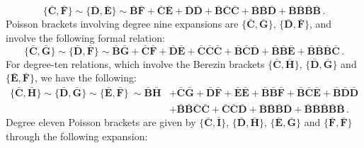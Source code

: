 \documentclass[10pt]{amsart}
\theoremstyle{definition}
\theoremstyle{corollary}
\theoremstyle{remark}
\theoremstyle{conclusion}
\begin{document}
\begin{equation}
	\{\bar{\mathbf{C}}, \bar{\mathbf{F}}\} \sim \{\bar{\mathbf{D}}, \bar{\mathbf{E}}\}\sim  \bar{\mathbf{B}}\bar{\mathbf{F}}+\bar{\mathbf{C}}\bar{\mathbf{E}}+\bar{\mathbf{D}}\bar{\mathbf{D}}+\bar{\mathbf{B}}\bar{\mathbf{C}}\bar{\mathbf{C}}+\bar{\mathbf{B}}\bar{\mathbf{B}}\bar{\mathbf{D}}+\bar{\mathbf{B}}\bar{\mathbf{B}}\bar{\mathbf{B}}\bar{\mathbf{B}} \,  .
	\label{deg8b}
\end{equation}
Poisson brackets involving degree nine expansions are $\{\bar{\mathbf{C}},\bar{\mathbf{G}}\}$,  $\{\bar{\mathbf{D}},\bar{\mathbf{F}} \}$, and involve the following formal relation:
\begin{equation}
	\{\bar{\mathbf{C}}, \bar{\mathbf{G}}\} \sim \{\bar{\mathbf{D}}, \bar{\mathbf{F}}\}\sim  \bar{\mathbf{B}} \bar{\mathbf{G}}+ \bar{\mathbf{C}} \bar{\mathbf{F}}+ \bar{\mathbf{D}} \bar{\mathbf{E}}+ \bar{\mathbf{C}} \bar{\mathbf{C}} \bar{\mathbf{C}}+ \bar{\mathbf{B}} \bar{\mathbf{C}} \bar{\mathbf{D}}+\bar{\mathbf{B}} \bar{\mathbf{B}} \bar{\mathbf{E}}+ \bar{\mathbf{B}} \bar{\mathbf{B}} \bar{\mathbf{B}} \bar{\mathbf{C}}\,  .
	\label{deg9b}
\end{equation}
For degree-ten relations, which involve the Berezin brackets $\{\bar{\mathbf{C}},\bar{\mathbf{H}} \}$,  $\{\bar{\mathbf{D}},\bar{\mathbf{G}} \}$ and $\{\bar{\mathbf{E}},\bar{\mathbf{F}} \}$, we have the following:
\begin{align}
	\{\bar{\mathbf{C}}, \bar{\mathbf{H}}\} \sim \{\bar{\mathbf{D}}, \bar{\mathbf{G}}\}\sim \{\bar{\mathbf{E}},\bar{ \mathbf{F}}\}\  \sim  \bar{\mathbf{B}}\bar{\mathbf{H}}&+\bar{\mathbf{C}}\bar{\mathbf{G}}+\bar{\mathbf{D}}\bar{\mathbf{F}}+\bar{\mathbf{E}}\bar{\mathbf{E}}+\bar{\mathbf{B}}\bar{\mathbf{B}}\bar{\mathbf{F}}+\bar{\mathbf{B}}\bar{\mathbf{C}}\bar{\mathbf{E}}+\bar{\mathbf{B}}\bar{\mathbf{D}}\bar{\mathbf{D}}\nonumber \\
&+\bar{\mathbf{B}}\bar{\mathbf{B}}\bar{\mathbf{C}}\bar{\mathbf{C}}+\bar{\mathbf{C}}\bar{\mathbf{C}}\bar{\mathbf{D}}+\bar{\mathbf{B}}\bar{\mathbf{B}}\bar{\mathbf{B}}\bar{\mathbf{D}}+\bar{\mathbf{B}}\bar{\mathbf{B}}\bar{\mathbf{B}}\bar{\mathbf{B}}\bar{\mathbf{B}} \, .
	\label{deg10b}
\end{align}
 Degree eleven Poisson brackets are given by $\{\bar{\mathbf{C}},\bar{\mathbf{I}} \}$,  $\{\bar{\mathbf{D}},\bar{\mathbf{H}} \}$, $\{\bar{\mathbf{E}},\bar{\mathbf{G}} \}$  and  $\{\bar{\mathbf{F}},\bar{\mathbf{F}} \}$ through the following expansion:
\end{document}
